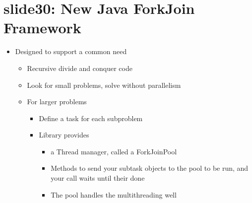 \documentclass[12pt, a4paper]{book}
\begin{document}
\section{slide30: New Java ForkJoin Framework}
\begin{itemize}
    \item Designed to support a common need
          \begin{itemize}
              \item Recursive divide and conquer code
              \item Look for small problems, solve without parallelism
              \item For larger problems
                    \begin{itemize}
                        \item Define a task for each subproblem
                        \item Library provides
                              \begin{itemize}
                                  \item a Thread manager, called a ForkJoinPool
                                  \item Methods to send your subtask objects to the pool to be run, and your call waits until their done
                                  \item The pool handles the multithreading well
                              \end{itemize}
                    \end{itemize}
          \end{itemize}
\end{itemize}
\end{document}
